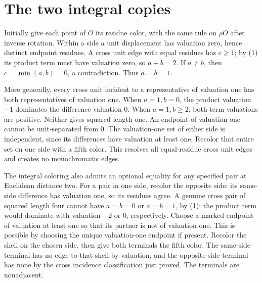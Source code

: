 \documentclass[10pt,letterpaper]{article}
\begin{document}
\section*{The two integral copies}
Initially give each point of \(O\) its residue color, with
the same rule on \(\rho O\) after inverse rotation. Within a side
a unit displacement has valuation zero, hence distinct
endpoint residues. A cross unit edge with equal residues has
\(c\ge1\); by (1) its product term must have valuation zero,
so \(a+b=2\). If \(a\ne b\), then \(c=\min(a,b)=0\),
a contradiction. Thus \(a=b=1\).

More generally, every cross unit incident to a representative
of valuation one has both representatives of valuation one.
When \(a=1,b=0\), the product valuation \(-1\) dominates the
difference valuation \(0\). When \(a=1,b\ge2\), both term
valuations are positive. Neither gives squared length one.
An endpoint of valuation one cannot be unit-separated from \(0\).
The valuation-one set of either side is independent, since its
differences have valuation at least one. Recolor that entire set
on one side with a fifth color. This resolves all equal-residue
cross unit edges and creates no monochromatic edges.

The integral coloring also admits an optional equality for any
specified pair at Euclidean distance two. For a pair in one side,
recolor the opposite side: its same-side difference has valuation one,
so its residues agree. A genuine cross pair of squared length four
cannot have \(a=b=0\) or \(a=b=1\), by (1): the product term
would dominate with valuation \(-2\) or \(0\), respectively.
Choose a marked endpoint of valuation at least one so that its
partner is not of valuation one. This is possible by choosing the
unique valuation-one endpoint if present. Recolor the shell on
the chosen side, then give both terminals the fifth color. The
same-side terminal has no edge to that shell by valuation, and
the opposite-side terminal has none by the cross incidence
classification just proved. The terminals are nonadjacent.
\end{document}
